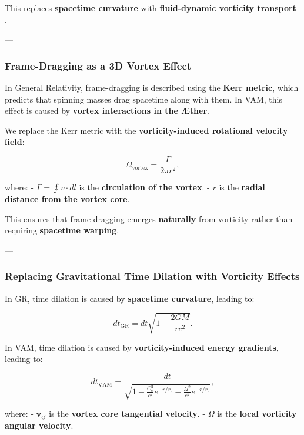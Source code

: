 \documentclass[a4paper,10pt]{article}
\begin{document}
This replaces \textbf{spacetime curvature} with \textbf{fluid-dynamic vorticity transport} \cite{lamb_hydrodynamics, feynman_superfluid}.

---

\subsubsection*{Frame-Dragging as a 3D Vortex Effect}

In General Relativity, frame-dragging is described using the \textbf{Kerr metric}, which predicts that spinning masses drag spacetime along with them. In VAM, this effect is caused by \textbf{vortex interactions in the Æther}.

We replace the Kerr metric with the \textbf{vorticity-induced rotational velocity field}:

\begin{equation*}
    \Omega_\text{vortex} = \frac{\Gamma}{2\pi r^2},
\end{equation*}

where:
- \( \Gamma = \oint v \cdot dl \) is the \textbf{circulation of the vortex}.
- \( r \) is the \textbf{radial distance from the vortex core}.

This ensures that frame-dragging emerges \textbf{naturally} from vorticity rather than requiring \textbf{spacetime warping}.

---

\subsubsection*{Replacing Gravitational Time Dilation with Vorticity Effects}

In GR, time dilation is caused by \textbf{spacetime curvature}, leading to:

\begin{equation*}
    dt_\text{GR} = dt \sqrt{1 - \frac{2GM}{rc^2}}.
\end{equation*}

In VAM, time dilation is caused by \textbf{vorticity-induced energy gradients}, leading to:

\begin{equation*}
    dt_\text{VAM} = \frac{dt}{\sqrt{1 - \frac{C_e^2}{c^2} e^{-r/r_c} - \frac{\Omega^2}{c^2} e^{-r/r_c}}},
\end{equation*}

where:
- \( \mathbf{v}_{\scriptscriptstyle\boldsymbol{\circlearrowleft}} \) is the \textbf{vortex core tangential velocity}.
- \( \Omega \) is the \textbf{local vorticity angular velocity}.
\end{document}

